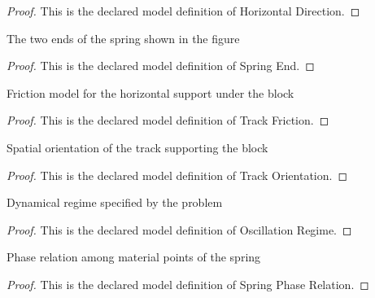 \begin{proof}
  This is the declared model definition of Horizontal Direction.
\end{proof}
\begin{definition}
  \label{def:physics:phyx-mini-0237:phyxminiproblems-problemphyxmini0237-springend}
  The two ends of the spring shown in the figure
\end{definition}
\begin{proof}
  This is the declared model definition of Spring End.
\end{proof}
\begin{definition}
  \label{def:physics:phyx-mini-0237:phyxminiproblems-problemphyxmini0237-trackfriction}
  Friction model for the horizontal support under the block
\end{definition}
\begin{proof}
  This is the declared model definition of Track Friction.
\end{proof}
\begin{definition}
  \label{def:physics:phyx-mini-0237:phyxminiproblems-problemphyxmini0237-trackorientation}
  Spatial orientation of the track supporting the block
\end{definition}
\begin{proof}
  This is the declared model definition of Track Orientation.
\end{proof}
\begin{definition}
  \label{def:physics:phyx-mini-0237:phyxminiproblems-problemphyxmini0237-oscillationregime}
  Dynamical regime specified by the problem
\end{definition}
\begin{proof}
  This is the declared model definition of Oscillation Regime.
\end{proof}
\begin{definition}
  \label{def:physics:phyx-mini-0237:phyxminiproblems-problemphyxmini0237-springphaserelation}
  Phase relation among material points of the spring
\end{definition}
\begin{proof}
  This is the declared model definition of Spring Phase Relation.
\end{proof}
